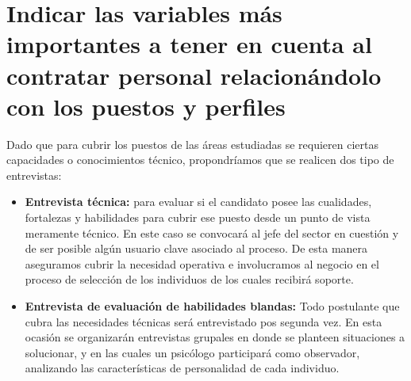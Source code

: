 \newpage

    \section{Indicar las variables más importantes a tener en cuenta al contratar personal relacionándolo con los puestos y perfiles}%
  
    
    Dado que para cubrir los puestos de las áreas estudiadas se requieren ciertas capacidades o conocimientos técnico, propondríamos que se realicen dos tipo de entrevistas:
    \begin{itemize}
	    \item \textbf{Entrevista técnica:} para evaluar si el candidato posee las cualidades, fortalezas y habilidades para cubrir ese puesto desde un punto de vista meramente técnico. En este caso se convocará al jefe del sector en cuestión y de ser posible algún usuario clave asociado al proceso. De esta manera aseguramos cubrir la necesidad operativa e involucramos al negocio en el proceso de selección de los individuos de los cuales recibirá soporte.
        \item \textbf{Entrevista de evaluación de habilidades blandas: } Todo postulante que cubra las necesidades técnicas será entrevistado pos segunda vez. En esta ocasión se organizarán entrevistas grupales en donde se planteen situaciones a solucionar, y en las cuales un psicólogo participará como observador, analizando las características de personalidad de cada individuo.
           \end{itemize}


